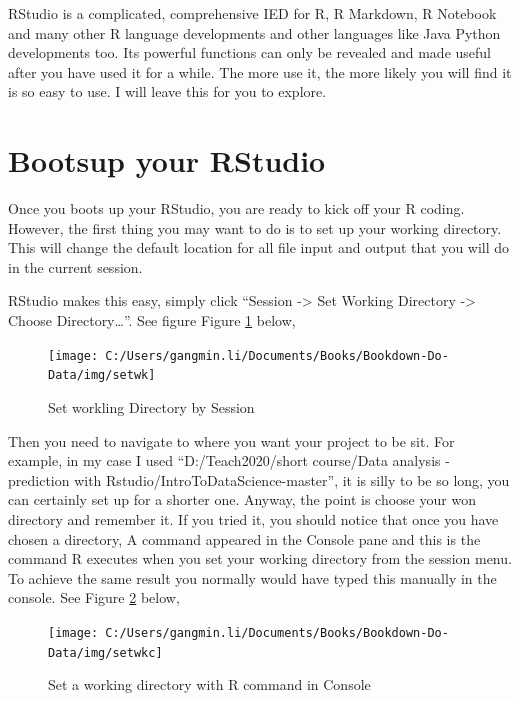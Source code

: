 \documentclass[
]{book}
\begin{document}
RStudio is a complicated, comprehensive IED for R, R Markdown, R Notebook and many other R language developments and other languages like Java Python developments too. Its powerful functions can only be revealed and made useful after you have used it for a while. The more use it, the more likely you will find it is so easy to use. I will leave this for you to explore.

\hypertarget{bootsup-your-rstudio}{%
\section{Bootsup your RStudio}\label{bootsup-your-rstudio}}

Once you boots up your RStudio, you are ready to kick off your R coding. However, the first thing you may want to do is to set up your working directory. This will change the default location for all file input and output that you will do in the current session.

RStudio makes this easy, simply click ``Session -\textgreater{} Set Working Directory -\textgreater{} Choose Directory\ldots{}''. See figure Figure \ref{fig:setwk} below,

\begin{figure}

{\centering \texttt{[image: C:/Users/gangmin.li/Documents/Books/Bookdown-Do-Data/img/setwk]} 

}

\caption{Set workling Directory by Session}\label{fig:setwk}
\end{figure}

Then you need to navigate to where you want your project to be sit. For example, in my case I used ``D:/Teach2020/short course/Data analysis - prediction with Rstudio/IntroToDataScience-master'', it is silly to be so long, you can certainly set up for a shorter one. Anyway, the point is choose your won directory and remember it. If you tried it, you should notice that once you have chosen a directory, A command appeared in the Console pane and this is the command R executes when you set your working directory from the session menu. To achieve the same result you normally would have typed this manually in the console. See Figure \ref{fig:setwkc} below,

\begin{figure}

{\centering \texttt{[image: C:/Users/gangmin.li/Documents/Books/Bookdown-Do-Data/img/setwkc]} 

}

\caption{Set a working directory with R command in Console}\label{fig:setwkc}
\end{figure}
\end{document}
